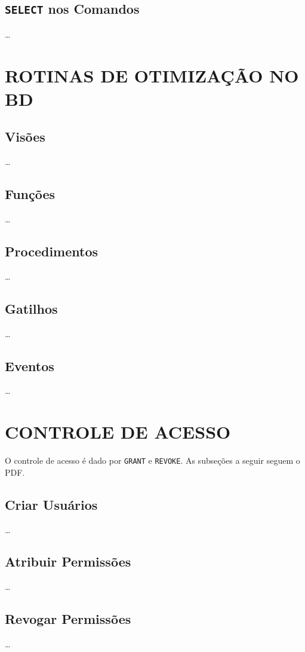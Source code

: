 \documentclass[
12pt,
a4paper,
semrecuonosumario,
sumario = abnt-6027-2012]{report}
\begin{document}
    \section{\texttt{SELECT} nos Comandos}
    \dots

\chapter{ROTINAS DE OTIMIZAÇÃO NO BD}\label{chap:otimizacao}
    \section{Visões}
    \dots

    \section{Funções}
    \dots

    \section{Procedimentos}
    \dots

    \section{Gatilhos}
    \dots

    \section{Eventos}
    \dots

\chapter{CONTROLE DE ACESSO}\label{chap:acesso}
O controle de acesso é dado por \texttt{GRANT} e \texttt{REVOKE}. As subseções a seguir seguem o PDF.

    \section{Criar Usuários}
    \dots

    \section{Atribuir Permissões}
    \dots

    \section{Revogar Permissões}
    \dots
\end{document}
